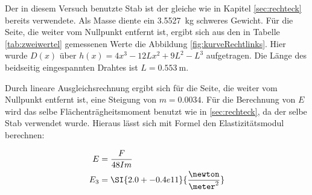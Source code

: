 Der in diesem Versuch benutzte Stab ist der gleiche wie in Kapitel \ref{sec:rechteck} bereits verwendete.
Als Masse diente ein \SI{3.5527}{\kilo\gram} schweres Gewicht. Für die Seite, die weiter vom Nullpunkt entfernt ist, ergibt
sich aus den in Tabelle \ref{tab:zweiwertel} gemessenen Werte
die Abbildung \ref{fig:kurveRechtlinks}. Hier wurde $D(x)$ über $h(x)=4x^3-12Lx^2+9L^2-L^3$ aufgetragen. Die Länge des beidseitig eingespannten Drahtes ist $L=\SI{0.553}{\meter}$.

Durch lineare Ausgleichsrechnung ergibt sich für die Seite, die weiter vom Nullpunkt entfernt ist, eine Steigung von $m=\num{0.0034}$.
Für die Berechnung von $E$ wird das selbe Flächenträgheitsmoment benutzt wie in \ref{sec:rechteck}, da der selbe Stab verwendet wurde.
Hieraus lässt sich mit Formel den Elastizitätsmodul berechnen:

\begin{align*}
  E   &= \frac{F}{48Im} \\
  E_3 &= \SI{2.0+-0.4e11}{\frac{\newton}{\meter^2}} \\
\end{align*}

